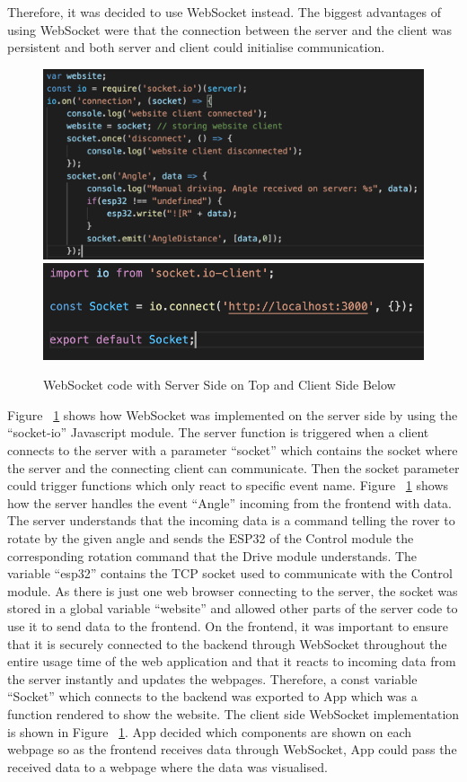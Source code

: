 \documentclass[a4paper]{article}
\begin{document}
Therefore, it was decided to use WebSocket instead. The biggest advantages of using WebSocket 
were that the connection between the server and the client was persistent and both server and 
client could initialise communication. 

\begin{figure}[H]
	\begin{Center}
		\includegraphics[width = 0.7\linewidth]{./images/WebSocket.png}
        \includegraphics[width = 0.7\linewidth]{./images/SocketClient.png}
		\caption{WebSocket code with Server Side on Top and Client Side Below}
        \label{fig:websocketServer}
	\end{Center}
\end{figure}



Figure ~\ref{fig:websocketServer} shows how WebSocket was implemented on the server 
side by using the “socket-io” Javascript module. \cite{WebSocketAPI} The server function is triggered 
when a client connects to the server with a parameter “socket” which contains the socket where 
the server and the connecting client can communicate. Then the socket parameter could trigger 
functions which only react to specific event name. Figure ~\ref{fig:websocketServer} shows how the server handles the 
event “Angle” incoming from the frontend with data. The server understands that the incoming 
data is a command telling the rover to rotate by the given angle and sends the ESP32 of the Control 
module the corresponding rotation command that the Drive module understands. The variable “esp32” 
contains the TCP socket used to communicate with the Control module. As there is just one 
web browser connecting to the server, the socket was stored in a global variable “website” and 
allowed other parts of the server code to use it to send data to the frontend. On the frontend, 
it was important to ensure that it is securely connected to the backend through WebSocket throughout 
the entire usage time of the web application and that it reacts to incoming data from the server 
instantly and updates the webpages. Therefore, a const variable “Socket” which connects to the 
backend was exported to App which was a function rendered to show the website. The client side WebSocket implementation 
is shown in Figure ~\ref{fig:websocketServer}. App decided which 
components are shown on each webpage so as the frontend receives data through WebSocket, App could 
pass the received data to a webpage where the data was visualised. 
\end{document}
